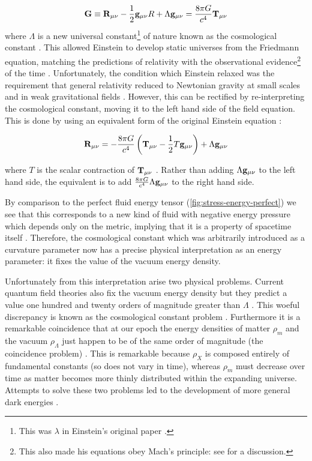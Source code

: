 \begin{equation}
\mathbf{G} 
    \equiv \mathbf{R}_{\mu\nu} - \frac{1}{2} \mathbf{g}_{\mu\nu} R + \Lambda{} \mathbf{g}_{\mu\nu}
    = \frac{8\pi{}G}{c^{4}} \mathbf{T}_{\mu\nu}
\label{eq:1.5}
\end{equation}
where $\Lambda$ is a new universal constant\footnote{This was $\lambda$ in Einstein’s original paper \cite{Einstein1918}.} of nature known as the cosmological constant \cite{Hobson2006}. This allowed Einstein to develop static universes from the Friedmann equation, matching the predictions of relativity with the observational evidence\footnote{This also made his equations obey Mach’s principle: see \cite{Einstein1918} for a discussion.} of the time \cite{Einstein1917,Harrison1993}. Unfortunately, the condition which Einstein relaxed was the requirement that general relativity reduced to Newtonian gravity at small scales and in weak gravitational fields \cite{Hobson2006}. However, this can be rectified by re-interpreting the cosmological constant, moving it to the left hand side of the field equation. This is done by using an equivalent form of the original Einstein equation \cite{Einstein1917}:

\begin{equation}
    \mathbf{R}_{\mu\nu} 
    = -\frac{8\pi{}G}{c^{4}} \left( 
        \mathbf{T}_{\mu\nu} - \frac{1}{2} T \mathbf{g}_{\mu\nu}
    \right) 
    + \Lambda{} \mathbf{g}_{\mu\nu}
\label{eq:1.6}
\end{equation}

where $T$ is the scalar contraction of $\mathbf{T}_{\mu\nu}$ \cite{Hobson2006}. Rather than adding $\Lambda\mathbf{g}_{\mu\nu}$ to the left hand side, the equivalent is to add $\frac{8\pi{}G}{c^4} \Lambda \mathbf{g}_{\mu\nu}$ to the right hand side. 

By comparison to the perfect fluid energy tensor (\cref{fig:stress-energy-perfect}) we see that this corresponds to a new kind of fluid with negative energy pressure which depends only on the metric, implying that it is a property of spacetime itself \cite{Hobson2006}. Therefore, the cosmological constant which was arbitrarily introduced as a curvature parameter now has a precise physical interpretation as an energy parameter: it fixes the value of the vacuum energy density. 

Unfortunately from this interpretation arise two physical problems. Current quantum field theories also fix the vacuum energy density but they predict a value one hundred and twenty orders of magnitude greater than $\Lambda$ \cite{Barnes2005,Hobson2006,LinderScherrer2009}. This woeful discrepancy is known as the cosmological constant problem \cite{Barnes2005,Olive2010}. Furthermore it is a remarkable coincidence that at our epoch the energy densities of matter $\rho_m$ and the vacuum $\rho_\Lambda$ just happen to be of the same order of magnitude (the coincidence problem) \cite{Barnes2005,Olive2010}. This is remarkable because $\rho_X$ is composed entirely of fundamental constants (so does not vary in time), whereas $\rho_m$ must decrease over time as matter becomes more thinly distributed within the expanding universe. Attempts to solve these two problems led to the development of more general dark energies \cite{LinderScherrer2009}.

